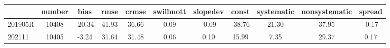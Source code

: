 \begin{tabular}{lcccccccccc}
\toprule
 & number & bias & rmse & crmse & swillmott & slopedev & const & systematic & nonsystematic & spread \\
\midrule
201905R & 10408 & -20.34 & 41.93 & 36.66 & 0.09 & -0.09 & -38.76 & 21.30 & 37.95 & -0.17 \\
202111 & 10405 & -3.24 & 31.64 & 31.48 & 0.06 & 0.10 & 15.99 & 7.35 & 29.37 & 0.17 \\
\bottomrule
\end{tabular}
